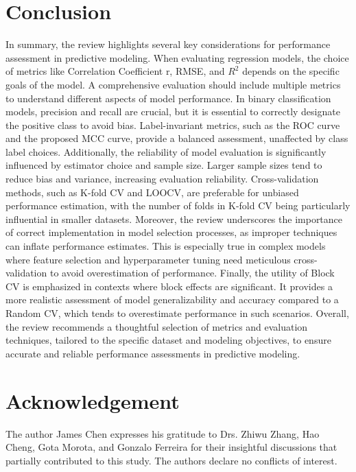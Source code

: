 \section{Conclusion}

In summary, the review highlights several key considerations for performance assessment in predictive modeling. When evaluating regression models, the choice of metrics like Correlation Coefficient r, RMSE, and $R^2$ depends on the specific goals of the model. A comprehensive evaluation should include multiple metrics to understand different aspects of model performance. In binary classification models, precision and recall are crucial, but it is essential to correctly designate the positive class to avoid bias. Label-invariant metrics, such as the ROC curve and the proposed MCC curve, provide a balanced assessment, unaffected by class label choices.
Additionally, the reliability of model evaluation is significantly influenced by estimator choice and sample size. Larger sample sizes tend to reduce bias and variance, increasing evaluation reliability. Cross-validation methods, such as K-fold CV and LOOCV, are preferable for unbiased performance estimation, with the number of folds in K-fold CV being particularly influential in smaller datasets. Moreover, the review underscores the importance of correct implementation in model selection processes, as improper techniques can inflate performance estimates. This is especially true in complex models where feature selection and hyperparameter tuning need meticulous cross-validation to avoid overestimation of performance. Finally, the utility of Block CV is emphasized in contexts where block effects are significant. It provides a more realistic assessment of model generalizability and accuracy compared to a Random CV, which tends to overestimate performance in such scenarios.
Overall, the review recommends a thoughtful selection of metrics and evaluation techniques, tailored to the specific dataset and modeling objectives, to ensure accurate and reliable performance assessments in predictive modeling.

\section{Acknowledgement}
The author James Chen expresses his gratitude to Drs. Zhiwu Zhang, Hao Cheng, Gota Morota, and Gonzalo Ferreira for their insightful discussions that partially contributed to this study. The authors declare no conflicts of interest.